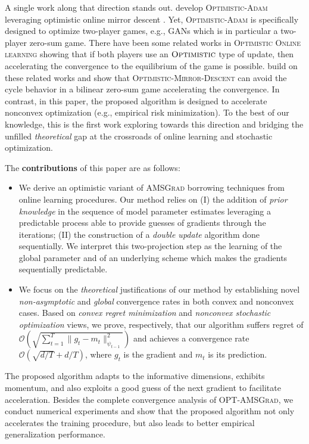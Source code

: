 \documentclass[twoside]{article}
\begin{document}
A single work along that direction stands out. 
\cite{DISZ18} develop \textsc{Optimistic-Adam} leveraging optimistic online mirror descent \citep{RS13b}.
Yet, \textsc{Optimistic-Adam} is specifically designed to optimize two-player games, e.g., GANs \citep{goodfellow2014generative} which is in particular a two-player zero-sum game. 
There have been some related works in \textsc{Optimistic Online learning} \citep{CJ12,RS13b,SALS15} showing that if both players use an $\textsc{Optimistic}$ type of update, then accelerating the convergence to the equilibrium of the game is possible.
\cite{DISZ18} build on these related works and show that \textsc{Optimistic-Mirror-Descent} can avoid the cycle behavior in a bilinear zero-sum game accelerating the convergence. 
In contrast, in this paper, the proposed algorithm is designed to accelerate nonconvex optimization (e.g., empirical risk minimization).
To the best of our knowledge, this is the first work exploring towards this direction and bridging the unfilled \emph{theoretical} gap at the crossroads of online learning and stochastic optimization.

The \textbf{contributions} of this paper are as follows:
\begin{itemize}
\item We derive an optimistic variant of \textsc{AMSGrad} borrowing techniques from online learning procedures. Our method relies on \textsf{(I)} the addition of \emph{prior knowledge} in the sequence of model parameter estimates leveraging a predictable process able to provide guesses of gradients through the iterations; \textsf{(II)} the construction of a \emph{double update} algorithm done sequentially. We interpret this two-projection step as the learning of the global parameter and of an underlying scheme which makes the gradients sequentially predictable.
\item We focus on the  \emph{theoretical} justifications of our method by establishing novel \emph{non-asymptotic} and \emph{global} convergence rates in both convex and nonconvex cases.  Based on \emph{convex regret minimization} and \emph{nonconvex stochastic optimization} views, we prove, respectively, that our algorithm suffers regret of $\mathcal{O}(\sqrt{\sum_{t=1}^T \| g_t - m_t  \|^2_{\psi_{t-1}}})$ and achieves a convergence rate $\mathcal{O}(\sqrt{d/T} +d/T )$, where $g_t$ is the gradient and $m_t$ is its prediction.
\end{itemize}
The proposed algorithm adapts to the informative dimensions, exhibits momentum, and also exploits a good guess of the next gradient to facilitate acceleration. 
Besides the complete convergence analysis of \textsc{OPT-AMSGrad}, we conduct numerical experiments and show that the proposed algorithm not only accelerates the training procedure, but also leads to better empirical generalization performance.
\end{document}
